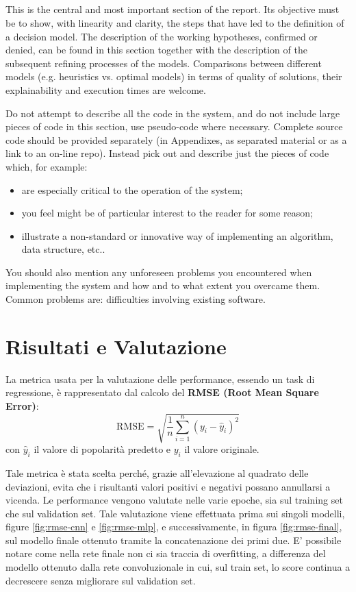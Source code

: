 \subsection{}

This is the central and most important section of the report. Its objective must be to show, with linearity and clarity, the steps that have led to the definition of a decision model. The description of the working hypotheses, confirmed or denied, can be found in this section together with the description of the subsequent refining processes of the models. Comparisons between different models (e.g. heuristics vs. optimal models) in terms of quality of solutions, their explainability and execution times are welcome. 

Do not attempt to describe all the code in the system, and do not include large pieces of code in this section, use pseudo-code where necessary. Complete source code should be provided separately (in Appendixes, as separated material or as a link to an on-line repo). Instead pick out and describe just the pieces of code which, for example:
\begin{itemize}
\item are especially critical to the operation of the system;
\item you feel might be of particular interest to the reader for some reason;
\item  illustrate a non-standard or innovative way of implementing an algorithm, data
structure, etc..
\end{itemize}

You should also mention any unforeseen problems you encountered when implementing the
system and how and to what extent you overcame them. Common problems are:
 difficulties involving existing software.


\newpage


\section{Risultati e Valutazione}

La metrica usata per la valutazione delle performance, essendo un task di regressione, è rappresentato dal calcolo del \textbf{RMSE (Root Mean Square Error)}:
\[
\textrm{RMSE} = \sqrt{\frac{1}{n} \sum_{i=1}^{n} (y_i - \hat{y}_i)^2} 
\]
con $\hat{y}_i$ il valore di popolarità predetto e $y_i$ il valore originale.


Tale metrica è stata scelta perché, grazie all'elevazione al quadrato delle deviazioni, evita che i risultanti valori positivi e negativi possano annullarsi a vicenda. Le performance vengono valutate nelle varie epoche, sia sul training set che sul validation set. Tale valutazione viene effettuata prima sui singoli modelli, figure \ref{fig:rmse-cnn} e \ref{fig:rmse-mlp}, e successivamente, in figura \ref{fig:rmse-final}, sul modello finale ottenuto tramite la concatenazione dei primi due. E' possibile notare come nella rete finale non ci sia traccia di overfitting, a differenza del modello ottenuto dalla rete convoluzionale in cui, sul train set, lo score continua a decrescere senza migliorare sul validation set. 


